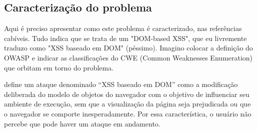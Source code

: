 \subsection{Caracterização do problema}

\begin{todo}
Aqui é preciso apresentar como este problema é caracterizado, nas referências cabíveis. Tudo indica que se trata de um "DOM-based XSS", que eu livremente traduzo como "XSS baseado em DOM" (péssimo). Imagino colocar a definição do OWASP e indicar as classificações do CWE (Common Weaknesses Enumeration) que orbitam em torno do problema.
\end{todo}

\cite{OWASP:DOMXSS} define um ataque denominado ``XSS baseado em DOM'' como a modificação deliberada do modelo de objetos do navegador com o objetivo de influenciar seu ambiente de execução, sem que a visualização da página seja prejudicada ou que o navegador se comporte inesperadamente. Por essa característica, o usuário não percebe que pode haver um ataque em andamento.

\tbc